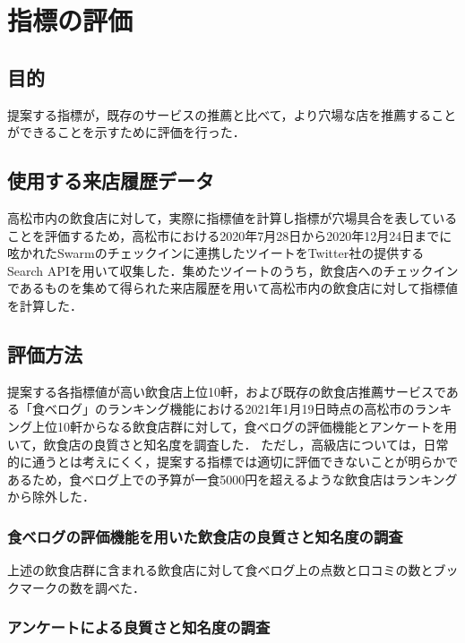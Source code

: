 \chapter{指標の評価}



\label{chap:experiment}

\section{目的}
提案する指標が，既存のサービスの推薦と比べて，より穴場な店を推薦することができることを示すために評価を行った．

\section{使用する来店履歴データ}
高松市内の飲食店に対して，実際に指標値を計算し指標が穴場具合を表していることを評価するため，高松市における2020年7月28日から2020年12月24日までに呟かれたSwarmのチェックインに連携したツイートをTwitter社の提供するSearch APIを用いて収集した．集めたツイートのうち，飲食店へのチェックインであるものを集めて得られた来店履歴を用いて高松市内の飲食店に対して指標値を計算した．

\section{評価方法}
提案する各指標値が高い飲食店上位10軒，および既存の飲食店推薦サービスである「食べログ」のランキング機能における2021年1月19日時点の高松市のランキング上位10軒からなる飲食店群に対して，食べログの評価機能とアンケートを用いて，飲食店の良質さと知名度を調査した．
ただし，高級店については，日常的に通うとは考えにくく，提案する指標では適切に評価できないことが明らかであるため，食べログ上での予算が一食5000円を超えるような飲食店はランキングから除外した．
	\subsection{食べログの評価機能を用いた飲食店の良質さと知名度の調査}\label{exp:scrutiny}

		上述の飲食店群に含まれる飲食店に対して食べログ上の点数と口コミの数とブックマークの数を調べた．

	\subsection{アンケートによる良質さと知名度の調査}\label{exp:questionnaire}

